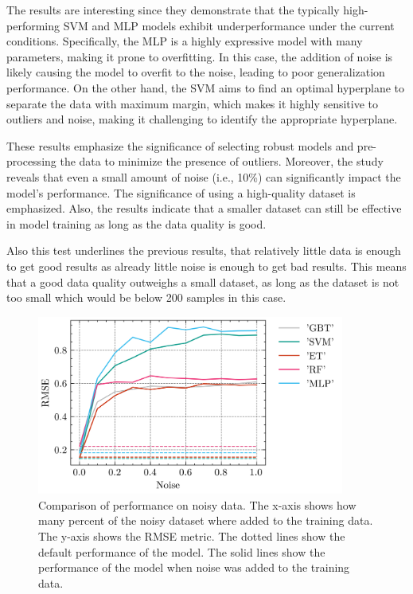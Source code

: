 The results are interesting since they demonstrate that the typically high-performing SVM and MLP models
exhibit underperformance under the current conditions.
Specifically, the MLP is a highly expressive model with many parameters, making it prone to overfitting.
In this case, the addition of noise is likely causing the model to overfit to the noise, leading to poor
generalization performance.
On the other hand, the SVM aims to find an optimal hyperplane to separate the data with maximum margin, which makes
it highly sensitive to outliers and noise, making it challenging to identify the appropriate hyperplane.

These results emphasize the significance of selecting robust models and pre-processing the data to minimize the
presence of outliers.
Moreover, the study reveals that even a small amount of noise (i.e., 10\%) can significantly impact the model's
performance.
The significance of using a high-quality dataset is emphasized.
Also, the results indicate that a smaller dataset can still be effective in model training as long as the data
quality is good.

Also this test underlines the previous results, that relatively little data is enough to get good results as already
little noise is enough to get bad results.
This means that a good data quality outweighs a small dataset, as long as the dataset is not too small which would
be below 200 samples in this case.


\begin{figure}[h]
    \begin{tcolorbox}[arc=0pt,boxrule=0.5pt]
        \centering
        \includegraphics[width=0.9\textwidth]{chap5/images/results_noise}
    \end{tcolorbox}
    \caption{Comparison of performance on noisy data.
    The x-axis shows how many percent of the noisy dataset where added to the training data.
    The y-axis shows the RMSE metric.
    The dotted lines show the default performance of the model.
    The solid lines show the performance of the model when noise was added to the training data.
    }
    \label{fig:results-noise-fig}
\end{figure}



